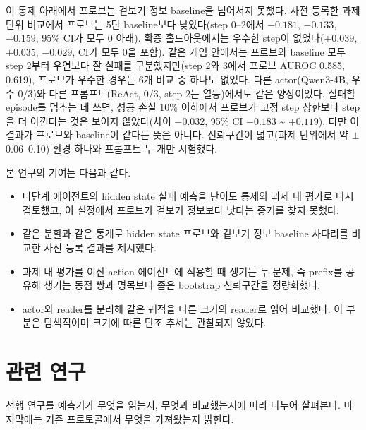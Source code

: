 \documentclass[11pt]{article}
\begin{document}
이 통제 아래에서 프로브는 겉보기 정보 baseline을 넘어서지 못했다. 사전 등록한 과제 단위 비교에서 프로브는 5단 baseline보다 낮았다(step 0--2에서 $-0.181$, $-0.133$, $-0.159$, 95\% CI가 모두 0 아래).
확증 홀드아웃에서는 우수한 step이 없었다($+0.039$, $+0.035$, $-0.029$, CI가 모두 0을 포함). 같은 게임 안에서는 프로브와 baseline 모두 step 2부터 우연보다 잘 실패를 구분했지만(step 2와 3에서 프로브 AUROC 0.585, 0.619),
프로브가 우수한 경우는 6개 비교 중 하나도 없었다. 다른 actor(Qwen3-4B, 우수 0/3)와 다른 프롬프트(ReAct, 0/3, step 2는 열등)에서도 같은 양상이었다.
실패할 episode를 멈추는 데 쓰면, 성공 손실 10\% 이하에서 프로브가 고정 step 상한보다 step을 더 아낀다는 것은 보이지 않았다(차이 $-0.032$, 95\% CI $-0.183$ \textasciitilde{} $+0.119$).
다만 이 결과가 프로브와 baseline이 같다는 뜻은 아니다. 신뢰구간이 넓고(과제 단위에서 약 $\pm$0.06--0.10) 환경 하나와 프롬프트 두 개만 시험했다.

본 연구의 기여는 다음과 같다.
\begin{itemize}
\item 다단계 에이전트의 hidden state 실패 예측을 난이도 통제와 과제 내 평가로 다시 검토했고, 이 설정에서 프로브가 겉보기 정보보다 낫다는 증거를 찾지 못했다.
\item 같은 분할과 같은 통계로 hidden state 프로브와 겉보기 정보 baseline 사다리를 비교한 사전 등록 결과를 제시했다.
\item 과제 내 평가를 이산 action 에이전트에 적용할 때 생기는 두 문제, 즉 prefix를 공유해 생기는 동점 쌍과 명목보다 좁은 bootstrap 신뢰구간을 정량화했다.
\item actor와 reader를 분리해 같은 궤적을 다른 크기의 reader로 읽어 비교했다. 이 부분은 탐색적이며 크기에 따른 단조 추세는 관찰되지 않았다.
\end{itemize}

\section{관련 연구}
선행 연구를 예측기가 무엇을 읽는지, 무엇과 비교했는지에 따라 나누어 살펴본다. 마지막에는 기존 프로토콜에서 무엇을 가져왔는지 밝힌다.
\end{document}
